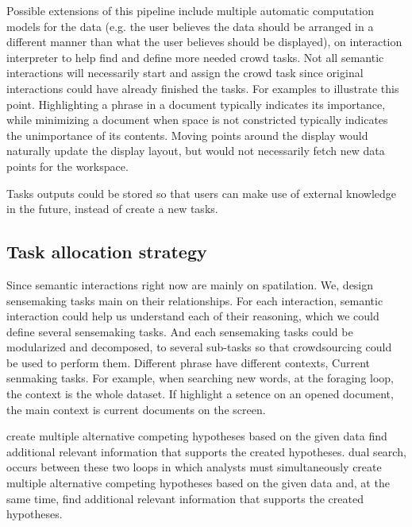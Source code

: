 \documentclass[journal]{vgtc}                %
\begin{document}
Possible extensions of this pipeline include multiple automatic computation models for the data (e.g. the user believes the data should be arranged in a different manner than what the user believes should be displayed), on interaction interpreter to help find and define more needed crowd tasks.
Not all semantic interactions will necessarily start and assign the crowd task since original interactions could have already finished the tasks.
For examples to illustrate this point.
Highlighting a phrase in a document typically indicates its importance, while minimizing a document when space is not constricted typically indicates the unimportance of its contents.
Moving points around the display would naturally update the display layout, but would not necessarily fetch new data points for the workspace.

Tasks outputs could be stored so that users can make use of external knowledge in the future, instead of create a new tasks.




\subsection{Task allocation strategy}

Since semantic interactions right now are mainly on spatilation. We, design sensemaking tasks main on their relationships.
For each interaction, semantic interaction could help us understand each of their reasoning, which we could define several sensemaking tasks.
And each sensemaking tasks could be modularized and decomposed, to several sub-tasks so that crowdsourcing could be used to perform them.
Different phrase have different contexts,
Current senmaking tasks. For example, when searching new words, at the foraging loop, the context is the whole dataset. If highlight a setence on an opened document, the main context is current documents on the screen.

create multiple alternative competing hypotheses based on the given data
find additional relevant information that supports the created hypotheses.
dual search, occurs between these two loops in which analysts must simultaneously create multiple alternative competing hypotheses based on the given data and, at the same time, find additional relevant information that supports the created hypotheses.
\end{document}
